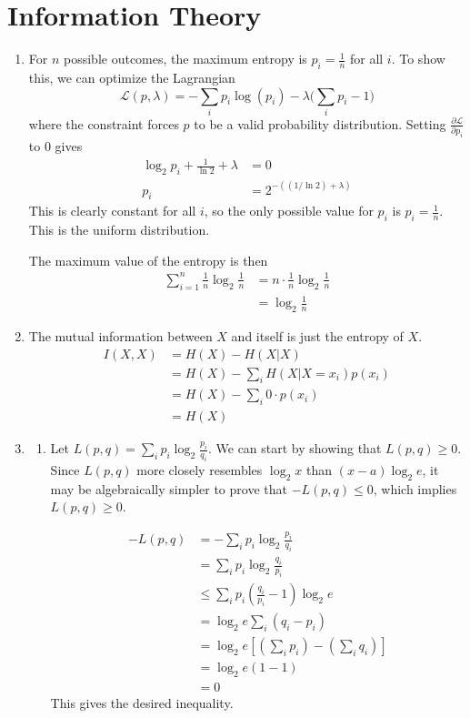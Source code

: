 \documentclass{article}
\begin{document}
\section{Information Theory}
\begin{enumerate}
    \item
    For $n$ possible outcomes, the maximum entropy is $p_i = \frac{1}{n}$ for all $i$. To show this, we can optimize the Lagrangian \[\mathcal{L}(p, \lambda) = -\sum_i p_i \log(p_i) - \lambda \big(\sum_i p_i - 1\big)\]
    where the constraint forces $p$ to be a valid probability distribution. Setting $\frac{\partial \mathcal{L}}{\partial p_i}$ to 0 gives
    \begin{align*}
        \log_2 p_i + \frac{1}{\ln 2} + \lambda &= 0 \\
        p_i &= 2^{-((1/\ln 2) + \lambda)}
    \end{align*}
    This is clearly constant for all $i$, so the only possible value for $p_i$ is $p_i = \frac{1}{n}$. This is the uniform distribution.
    
    The maximum value of the entropy is then
    \begin{align*}
        \sum_{i=1}^n \frac{1}{n} \log_2 \frac{1}{n} &= n \cdot \frac{1}{n} \log_2 \frac{1}{n} \\
        &= \log_2 \frac{1}{n}
    \end{align*}
    
    \item
    The mutual information between $X$ and itself is just the entropy of $X$.
    \begin{align*}
        I(X,X) &= H(X) - H(X|X) \\
        &= H(X) - \sum_i H(X | X=x_i) p(x_i) \\
        &= H(X) - \sum_i 0 \cdot p(x_i) \\
        &= H(X)
    \end{align*}
    
    \item
    \begin{enumerate}
        \item
        Let $L(p,q) = \sum_i p_i \log_2 \frac{p_i}{q_i}$. We can start by showing that $L(p,q) \geq 0$. Since $L(p,q)$ more closely resembles $\log_2 x$ than $(x-a) \log_2 e$, it may be algebraically simpler to prove that $-L(p,q) \leq 0$, which implies $L(p,q) \geq 0$.
        
        \begin{align*}
            -L(p,q) &= -\sum_i p_i \log_2 \frac{p_i}{q_i} \\
            &= \sum_i p_i \log_2 \frac{q_i}{p_i} \\
            &\leq \sum_i p_i \left( \frac{q_i}{p_i} - 1 \right) \log_2 e \\
            &= \log_2 e \sum_i (q_i - p_i) \\
            &= \log_2 e \left[ \left( \sum_i p_i \right) - \left( \sum_i q_i \right) \right] \\
            &= \log_2 e (1-1) \\
            &= 0
        \end{align*}
        This gives the desired inequality.
        

\end{enumerate}
\end{enumerate}
\end{document}
